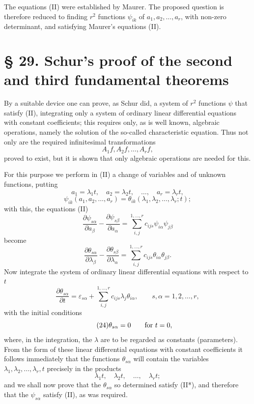 \documentclass[11pt]{book}
\begin{document}
The equations (II) were established by Maurer. The proposed question is therefore reduced to finding $r^2$ functions $\psi_{ik}$ of $a_1,a_2,\ldots,a_r$, with non-zero determinant, and satisfying Maurer's equations (II).

\section*{\S{} 29. Schur's proof of the second and third fundamental theorems}

By a suitable device one can prove, as Schur did, a system of $r^2$ functions $\psi$ that satisfy (II), integrating only a system of ordinary linear differential equations with constant coefficients; this requires only, as is well known, algebraic operations, namely the solution of the so-called characteristic equation. Thus not only are the required infinitesimal transformations
\[
 A_1f,A_2f,\ldots,A_rf,
\]
proved to exist, but it is shown that only algebraic operations are needed for this.

For this purpose we perform in (II) a change of variables and of unknown functions, putting
\[
 a_1=\lambda_1t,
 \quad a_2=\lambda_2t,
 \quad \ldots,
 \quad a_r=\lambda_rt,
\]
\[
 \psi_{ik}(a_1,a_2,\ldots,a_r)=\theta_{ik}(\lambda_1,\lambda_2,\ldots,\lambda_r;t);
\]
with this, the equations (II)
\[
 \frac{\partial\psi_{s\alpha}}{\partial a_\beta}
 -\frac{\partial\psi_{s\beta}}{\partial a_\alpha}
 =\sum\limits_{i,j}^{1,\ldots,r}c_{ijs}\psi_{i\alpha}\psi_{j\beta}
\]
become
\begin{equation*}\tag{II*}
 \frac{\partial\theta_{s\alpha}}{\partial\lambda_\beta}
 -\frac{\partial\theta_{s\beta}}{\partial\lambda_\alpha}
 =\sum\limits_{i,j}^{1,\ldots,r}c_{ijs}\theta_{i\alpha}\theta_{j\beta}.
\end{equation*}
Now integrate the system of ordinary linear differential equations with respect to $t$
\begin{equation*}\tag{23}
 \frac{\partial\theta_{s\alpha}}{\partial t}
 =\varepsilon_{s\alpha}+\sum\limits_{i,j}^{1,\ldots,r}c_{ijs}\lambda_j\theta_{i\alpha},
 \qquad s,\alpha=1,2,\ldots,r,
\end{equation*}
with the initial conditions
\begin{equation*}\tag{24}
 \theta_{s\alpha}=0\qquad\hbox{for }t=0,
\end{equation*}
where, in the integration, the $\lambda$ are to be regarded as constants (parameters). From the form of these linear differential equations with constant coefficients it follows immediately that the functions $\theta_{s\alpha}$ will contain the variables $\lambda_1,\lambda_2,\ldots,\lambda_r,t$ precisely in the products
\[
 \lambda_1t,\quad \lambda_2t,\quad \ldots,
 \quad \lambda_rt;
\]
and we shall now prove that the $\theta_{s\alpha}$ so determined satisfy (II*), and therefore that the $\psi_{s\alpha}$ satisfy (II), as was required.
\end{document}
